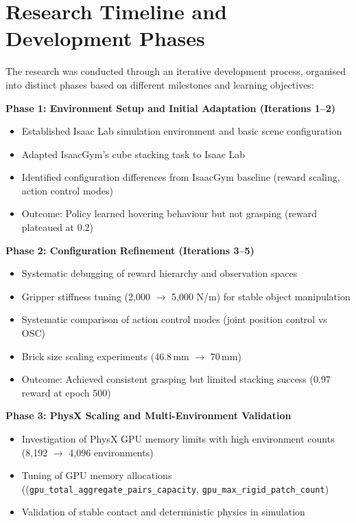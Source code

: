 \documentclass[12pt,a4paper,oneside]{report}
\begin{document}
\section{Research Timeline and Development Phases}

The research was conducted through an iterative development process, organised into distinct phases based on different milestones and learning objectives:

\textbf{Phase 1: Environment Setup and Initial Adaptation (Iterations 1--2)}
\begin{itemize}
    \item Established Isaac Lab simulation environment and basic scene configuration
    \item Adapted IsaacGym's cube stacking task to Isaac Lab
    \item Identified configuration differences from IsaacGym baseline (reward scaling, action control modes)
    \item Outcome: Policy learned hovering behaviour but not grasping (reward plateaued at 0.2)
\end{itemize}

\textbf{Phase 2: Configuration Refinement (Iterations 3--5)}
\begin{itemize}
    \item Systematic debugging of reward hierarchy and observation spaces
    \item Gripper stiffness tuning (2{,}000 $\rightarrow$ 5{,}000 N/m) for stable object manipulation
    \item Systematic comparison of action control modes (joint position control vs OSC)
    \item Brick size scaling experiments (46.8\,mm $\rightarrow$ 70\,mm)
    \item Outcome: Achieved consistent grasping but limited stacking success (0.97 reward at epoch 500)
\end{itemize}

\textbf{Phase 3: PhysX Scaling and Multi-Environment Validation}
\begin{itemize}
    \item Investigation of PhysX GPU memory limits with high environment counts (8{,}192 $\rightarrow$ 4{,}096 environments)
    \item Tuning of GPU memory allocations ((\texttt{gpu\_total\_\allowbreak aggregate\_\allowbreak pairs\_\allowbreak capacity}, 
    \texttt{gpu\_max\_\allowbreak rigid\_\allowbreak patch\_\allowbreak count})
    \item Validation of stable contact and deterministic physics in simulation
\end{itemize}
\end{document}
